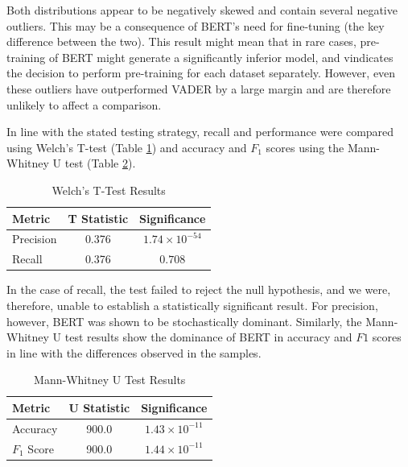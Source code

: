 \documentclass{csfourzero}
\begin{document}
\par 
Both distributions appear to be negatively skewed and contain several negative outliers. This may be a consequence of BERT's need for fine-tuning (the key difference between the two). This result might mean that in rare cases, pre-training of BERT might generate a significantly inferior model, and vindicates the decision to perform pre-training for each dataset separately. However, even these outliers have outperformed VADER by a large margin and are therefore unlikely to affect a comparison.

\par

In line with the stated testing strategy, recall and performance were compared using Welch's T-test (Table \ref{tab:indiettest}) and accuracy and $F_1$ scores using the Mann-Whitney U test (Table \ref{tab:mannwhitney}).

\begin{table}[H]
    \centering
    \caption{Welch's T-Test Results}
    \begin{tabular}[t]{lcc}
        \hline
            Metric & T Statistic & Significance \\
        \hline
        Precision & 0.376 & $1.74 \times 10^{-54} $  \\
        Recall & 0.376 & $0.708$ \\
        \hline
    \end{tabular}
    \label{tab:indiettest}
\end{table}

\par

In the case of recall, the test failed to reject the null hypothesis, and we were, therefore, unable to establish a statistically significant result. For precision, however, BERT was shown to be stochastically dominant. Similarly, the Mann-Whitney U test results show the dominance of BERT in accuracy and $F1$ scores in line with the differences observed in the samples.


\begin{table}[H]
    \centering
    \caption{Mann-Whitney U Test Results}
    \begin{tabular}[t]{lcc}
        \hline
            Metric & U Statistic & Significance \\
        \hline
        Accuracy & 900.0 & $1.43 \times 10^{-11} $  \\
        $F_1$ Score & 900.0 & $1.44 \times 10^{-11} $ \\
        \hline
    \end{tabular}
    \label{tab:mannwhitney}
\end{table}
\end{document}
